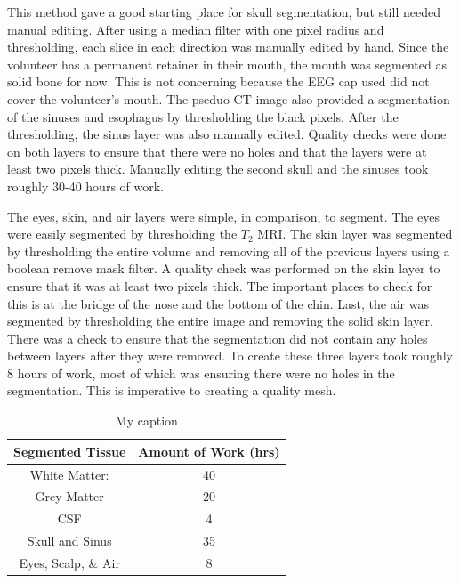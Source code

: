 This method gave a good starting place for skull segmentation, but still needed manual editing. After using a median filter with one pixel radius and thresholding, each slice in each direction was manually edited by hand. Since the volunteer has a permanent retainer in their mouth, the mouth was segmented as solid bone for now. This is not concerning because the EEG cap used did not cover the volunteer's mouth. The pseduo-CT image also provided a segmentation of the sinuses and esophagus by thresholding the black pixels. After the thresholding, the sinus layer was also manually edited. Quality checks were done on both layers to ensure that there were no holes and that the layers were at least two pixels thick. Manually editing the second skull and the sinuses took roughly 30-40 hours of work. 

The eyes, skin, and air layers were simple, in comparison, to segment. The eyes were easily segmented by thresholding the $T_2$ MRI. The skin layer was segmented by thresholding the entire volume and removing all of the previous layers using a boolean remove mask filter. A quality check was performed on the skin layer to ensure that it was at least two pixels thick. The important places to check for this is at the bridge of the nose and the bottom of the chin. Last, the air was segmented by thresholding the entire image and removing the solid skin layer. There was a check to ensure that the segmentation did not contain any holes between layers after they were removed. To create these three layers took roughly 8 hours of work, most of which was ensuring there were no holes in the segmentation. This is imperative to creating a quality mesh.

\begin{table}[H]
\centering
\caption{My caption}
\label{my-label}
\begin{tabular}{|c|c|}
\hline
Segmented Tissue    & Amount of Work (hrs) \\ \hline
White Matter:       & 40                   \\ \hline
Grey Matter         & 20                   \\ \hline
CSF                 & 4                    \\ \hline
Skull and Sinus     & 35                   \\ \hline
Eyes, Scalp, \& Air & 8                    \\ \hline
\end{tabular}
\end{table}

